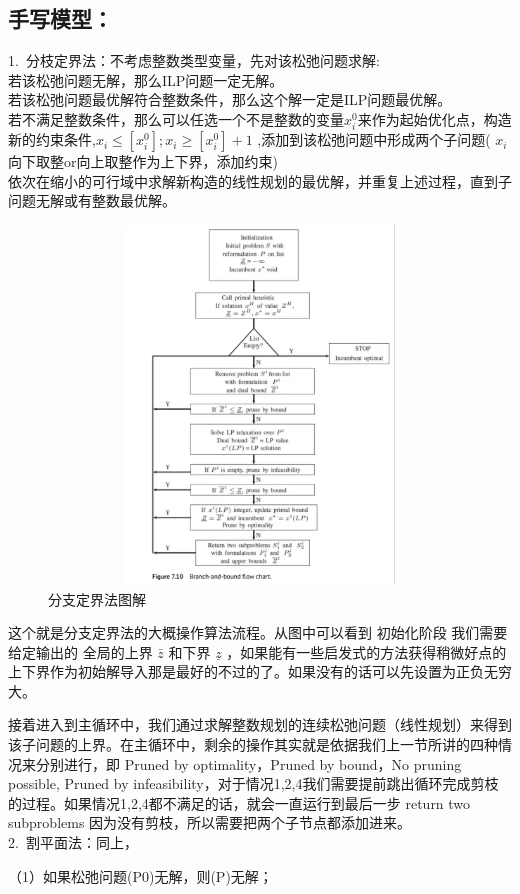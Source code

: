 \documentclass[a4paper,20pt]{article}
\begin{document}
    \subsection{手写模型：}
    1.~分枝定界法：不考虑整数类型变量，先对该松弛问题求解:
    \\若该松弛问题无解，那么ILP问题一定无解。
    \\若该松弛问题最优解符合整数条件，那么这个解一定是ILP问题最优解。
    \\若不满足整数条件，那么可以任选一个不是整数的变量$x_i^0$来作为起始优化点，构造新的约束条件,$x_i \leq \left[x_i^0\right];x_i\geq \left[x_i^0\right]+1 $ ,添加到该松弛问题中形成两个子问题( $x_i$向下取整or向上取整作为上下界，添加约束)
    \\依次在缩小的可行域中求解新构造的线性规划的最优解，并重复上述过程，直到子问题无解或有整数最优解。
    \begin{figure}[H]
        \centering
        \includegraphics[width=340pt,height=270pt]{figure3.png}
        \caption{分支定界法图解}
    \end{figure}
    这个就是分支定界法的大概操作算法流程。从图中可以看到 初始化阶段 我们需要给定输出的 全局的上界 $\bar{z}$ 和下界 $\underline{z}$ ，如果能有一些启发式的方法获得稍微好点的上下界作为初始解导入那是最好的不过的了。如果没有的话可以先设置为正负无穷大。

接着进入到主循环中，我们通过求解整数规划的连续松弛问题（线性规划）来得到该子问题的上界。在主循环中，剩余的操作其实就是依据我们上一节所讲的四种情况来分别进行，即 Pruned by optimality，Pruned by bound，No pruning possible, Pruned by infeasibility，对于情况1,2,4我们需要提前跳出循环完成剪枝的过程。如果情况1,2,4都不满足的话，就会一直运行到最后一步 return two subproblems 因为没有剪枝，所以需要把两个子节点都添加进来。
\\2.~割平面法：同上，
\par \noindent（1）如果松弛问题(P0)无解，则(P)无解；
\end{document}
